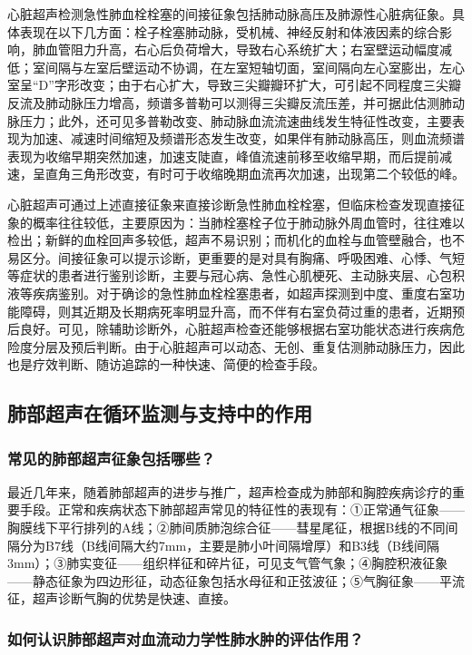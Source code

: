 心脏超声检测急性肺血栓栓塞的间接征象包括肺动脉高压及肺源性心脏病征象。具体表现在以下几方面：栓子栓塞肺动脉，受机械、神经反射和体液因素的综合影响，肺血管阻力升高，右心后负荷增大，导致右心系统扩大；右室壁运动幅度减低；室间隔与左室后壁运动不协调，在左室短轴切面，室间隔向左心室膨出，左心室呈“D”字形改变；由于右心扩大，导致三尖瓣瓣环扩大，可引起不同程度三尖瓣反流及肺动脉压力增高，频谱多普勒可以测得三尖瓣反流压差，并可据此估测肺动脉压力；此外，还可见多普勒改变、肺动脉血流流速曲线发生特征性改变，主要表现为加速、减速时间缩短及频谱形态发生改变，如果伴有肺动脉高压，则血流频谱表现为收缩早期突然加速，加速支陡直，峰值流速前移至收缩早期，而后提前减速，呈直角三角形改变，有时可于收缩晚期血流再次加速，出现第二个较低的峰。

心脏超声可通过上述直接征象来直接诊断急性肺血栓栓塞，但临床检查发现直接征象的概率往往较低，主要原因为：当肺栓塞栓子位于肺动脉外周血管时，往往难以检出；新鲜的血栓回声多较低，超声不易识别；而机化的血栓与血管壁融合，也不易区分。间接征象可以提示诊断，更重要的是对具有胸痛、呼吸困难、心悸、气短等症状的患者进行鉴别诊断，主要与冠心病、急性心肌梗死、主动脉夹层、心包积液等疾病鉴别。对于确诊的急性肺血栓栓塞患者，如超声探测到中度、重度右室功能障碍，则其近期及长期病死率明显升高，而不伴有右室负荷过重的患者，近期预后良好。可见，除辅助诊断外，心脏超声检查还能够根据右室功能状态进行疾病危险度分层及预后判断。由于心脏超声可以动态、无创、重复估测肺动脉压力，因此也是疗效判断、随访追踪的一种快速、简便的检查手段。

\subsection{肺部超声在循环监测与支持中的作用}

\subsubsection{常见的肺部超声征象包括哪些？}

最近几年来，随着肺部超声的进步与推广，超声检查成为肺部和胸腔疾病诊疗的重要手段。正常和疾病状态下肺部超声常见的特征性的表现有：①正常通气征象------胸膜线下平行排列的A线；②肺间质肺泡综合征------彗星尾征，根据B线的不同间隔分为B7线（B线间隔大约7mm，主要是肺小叶间隔增厚）和B3线（B线间隔3mm）；③肺实变征------组织样征和碎片征，可见支气管气象；④胸腔积液征象------静态征象为四边形征，动态征象包括水母征和正弦波征；⑤气胸征象------平流征，超声诊断气胸的优势是快速、直接。

\subsubsection{如何认识肺部超声对血流动力学性肺水肿的评估作用？}

